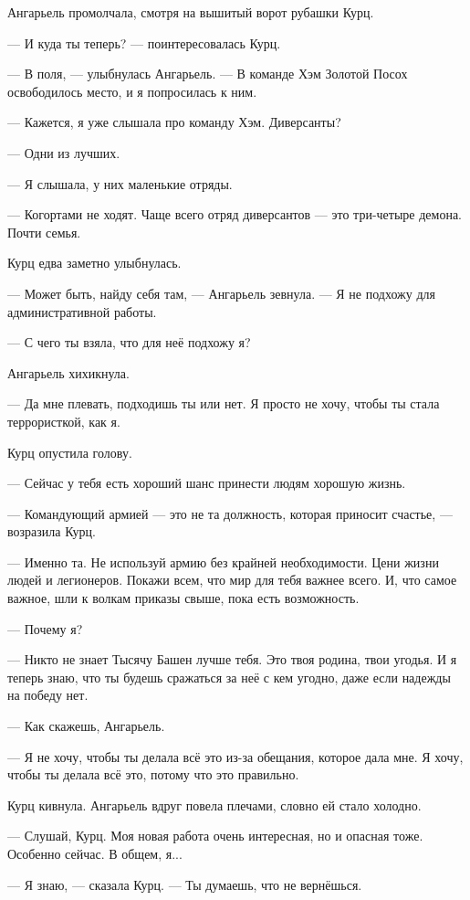 Ангарьель промолчала, смотря на вышитый ворот рубашки Курц.

--- И куда ты теперь? --- поинтересовалась Курц.

--- В поля, --- улыбнулась Ангарьель.
--- В команде Хэм Золотой Посох освободилось место, и я попросилась к ним.

--- Кажется, я уже слышала про команду Хэм.
Диверсанты?

--- Одни из лучших.

--- Я слышала, у них маленькие отряды.

--- Когортами не ходят.
Чаще всего отряд диверсантов --- это три-четыре демона.
Почти семья.

Курц едва заметно улыбнулась.

--- Может быть, найду себя там, --- Ангарьель зевнула.
--- Я не подхожу для административной работы.

--- С чего ты взяла, что для неё подхожу я?

Ангарьель хихикнула.

--- Да мне плевать, подходишь ты или нет.
Я просто не хочу, чтобы ты стала террористкой, как я.

Курц опустила голову.

--- Сейчас у тебя есть хороший шанс принести людям хорошую жизнь.

--- Командующий армией --- это не та должность, которая приносит счастье, --- возразила Курц.

--- Именно та.
Не используй армию без крайней необходимости.
Цени жизни людей и легионеров.
Покажи всем, что мир для тебя важнее всего.
И, что самое важное, шли к волкам приказы свыше, пока есть возможность.

--- Почему я?

--- Никто не знает Тысячу Башен лучше тебя.
Это твоя родина, твои угодья.
И я теперь знаю, что ты будешь сражаться за неё с кем угодно, даже если надежды на победу нет.

--- Как скажешь, Ангарьель.

--- Я не хочу, чтобы ты делала всё это из-за обещания, которое дала мне.
Я хочу, чтобы ты делала всё это, потому что это правильно.

Курц кивнула.
Ангарьель вдруг повела плечами, словно ей стало холодно.

--- Слушай, Курц.
Моя новая работа очень интересная, но и опасная тоже.
Особенно сейчас.
В общем, я...

--- Я знаю, --- сказала Курц.
--- Ты думаешь, что не вернёшься.

